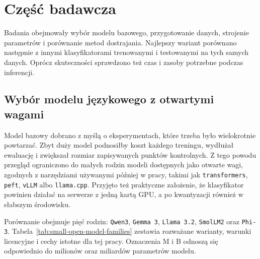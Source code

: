 \chapter{Część badawcza}

Badania obejmowały wybór modelu bazowego, przygotowanie danych, strojenie
parametrów i porównanie metod dostrajania. Najlepszy wariant porównano następnie
z innymi klasyfikatorami trenowanymi i testowanymi na tych samych danych. Oprócz
skuteczności sprawdzono też czas i zasoby potrzebne podczas inferencji.

\section{Wybór modelu językowego z otwartymi wagami}
Model bazowy dobrano z myślą o eksperymentach, które trzeba było wielokrotnie
powtarzać. Zbyt duży model podnosiłby koszt każdego treningu,
wydłużał ewaluację i zwiększał rozmiar zapisywanych punktów kontrolnych. Z tego
powodu przegląd ograniczono do małych rodzin modeli dostępnych jako otwarte
wagi, zgodnych z narzędziami używanymi później w pracy, takimi jak
\texttt{transformers}, \texttt{peft}, \texttt{vLLM} albo \texttt{llama.cpp}.
Przyjęto też praktyczne założenie, że klasyfikator powinien działać na serwerze
z jedną kartą GPU, a po kwantyzacji również w słabszym środowisku.

Porównanie obejmuje pięć rodzin: \texttt{Qwen3}, \texttt{Gemma 3},
\texttt{Llama 3.2}, \texttt{SmolLM2} oraz \texttt{Phi-3}. Tabela~\ref{tab:small-open-model-families}
zestawia rozważane warianty, warunki licencyjne i cechy istotne dla tej pracy.
Oznaczenia M i B odnoszą się odpowiednio do milionów oraz miliardów parametrów
modelu.

